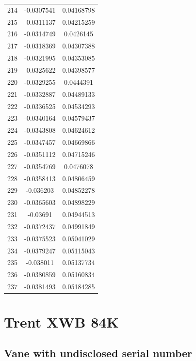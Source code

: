 \documentclass[a4paper, 11pt, oneside]{report}
\begin{document}
{\begin{longtable}{|c|c|c|}
214 & -0.0307541 & 0.04168798 \\
215 & -0.0311137 & 0.04215259 \\
216 & -0.0314749 & 0.0426145  \\
217 & -0.0318369 & 0.04307388 \\
218 & -0.0321995 & 0.04353085 \\
219 & -0.0325622 & 0.04398577 \\
220 & -0.0329255 & 0.0444391  \\
221 & -0.0332887 & 0.04489133 \\
222 & -0.0336525 & 0.04534293 \\
223 & -0.0340164 & 0.04579437 \\
224 & -0.0343808 & 0.04624612 \\
225 & -0.0347457 & 0.04669866 \\
226 & -0.0351112 & 0.04715246 \\
227 & -0.0354769 & 0.0476078  \\
228 & -0.0358413 & 0.04806459 \\
229 & -0.036203  & 0.04852278 \\
230 & -0.0365603 & 0.04898229 \\
231 & -0.03691   & 0.04944513 \\
232 & -0.0372437 & 0.04991849 \\
233 & -0.0375523 & 0.05041029 \\
234 & -0.0379247 & 0.05115043 \\
235 & -0.038011  & 0.05137734 \\
236 & -0.0380859 & 0.05160834 \\
237 & -0.0381493 & 0.05184285 \\
\hline
\end{longtable}
\unskip
\unpenalty
\unpenalty}

\begin{multicols}{2}
\unvbox\ltmcbox
\end{multicols}


\section{Trent XWB 84K} \label{coordinates_xwb}

\subsection{Vane with undisclosed serial number}
\end{document}

